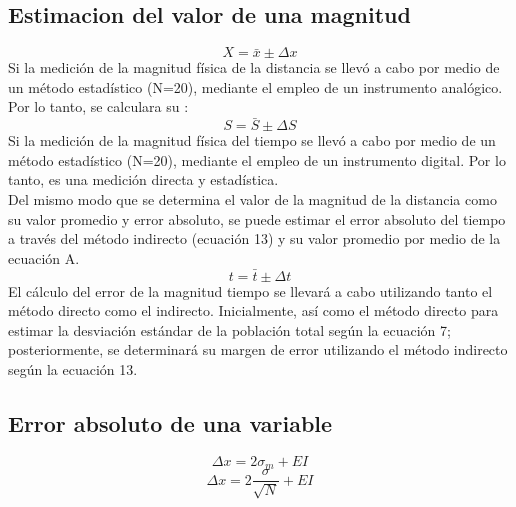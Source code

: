 \documentclass[runningheads]{llncs}
\begin{document}
    \subsection{Estimacion del valor de una magnitud}
    \begin{equation}
        X=\bar{x}\pm \Delta x
    \end{equation}
    Si la medición de la magnitud física de la distancia se llevó a cabo por medio de un método estadístico (N=20), mediante el empleo de un instrumento analógico. Por lo tanto, se calculara su : 
    \begin{equation}
        S=\bar{S}\pm \Delta S
    \end{equation}
    Si la medición de la magnitud física del tiempo se llevó a cabo por medio de un método estadístico (N=20), mediante el empleo de un instrumento digital. Por lo tanto, es una medición directa y estadística. \\
    Del mismo modo que se determina el valor de la magnitud de la distancia como su valor promedio y error absoluto, se puede estimar el error absoluto del tiempo a través del método indirecto (ecuación 13) y su valor promedio por medio de la ecuación A.\\
    \begin{equation}
        t=\bar{t}\pm \Delta t
    \end{equation}
    El cálculo del error de la magnitud tiempo se llevará a cabo utilizando tanto el método directo como el indirecto. Inicialmente, así como el método directo para estimar la desviación estándar de la población total según la ecuación 7; posteriormente, se determinará su margen de error utilizando el método indirecto según la ecuación 13.\\
    \subsection{Error absoluto de una variable}
    \begin{equation}
        \Delta x=2\sigma_{m}+EI
    \end{equation}
    \begin{equation}
        \Delta x=2\frac{\sigma}{\sqrt{N}}+EI
    \end{equation}
\end{document}
